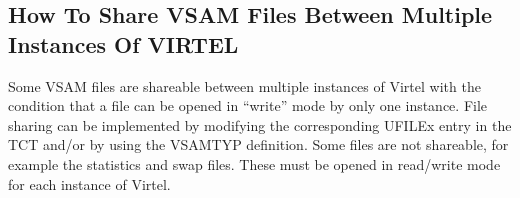 \documentclass[letterpaper,10pt,english]{sphinxmanual}
\begin{document}
\begin{sphinxVerbatim}[commandchars=\\\{\}]

                             
                                                    
                                                       
                                                       
                                                       
         
                               
                                                    
                                                      
                                                       
                                                      
        
\end{sphinxVerbatim}

\ignorespaces 

\subsection{How To Share VSAM Files Between Multiple Instances Of VIRTEL}
\label{\detokenize{Installation_Guide:how-to-share-vsam-files-between-multiple-instances-of-virtel}}\label{\detokenize{Installation_Guide:index-145}}
Some VSAM files are shareable between multiple instances of Virtel with the condition that a file can be opened in “write” mode by only one instance. File sharing can be implemented by modifying the corresponding UFILEx entry in the TCT and/or by using the VSAMTYP definition. Some files are not shareable, for example the statistics and swap files. These must be opened in read/write mode for each instance of Virtel.
\end{document}
